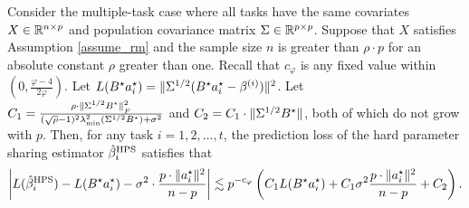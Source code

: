 \begin{theorem}\label{thm_many_tasks}
	Consider the multiple-task case where all tasks have the same covariates $X\in\mathbb{R}^{n\times p}$ and population covariance matrix $\Sigma\in\mathbb{R}^{p\times p}$.
	Suppose that $X$ satisfies Assumption \ref{assume_rm} and the sample size $n$ is greater than $\rho \cdot p$ for an absolute constant $\rho$ greater than one.
	Recall that $c_{\varphi}$ is any fixed value within $(0, \frac{\varphi-4}{2\varphi})$.
	Let $L(B^{\star}a_i^{\star}) = \|\Sigma^{1/2} (B^{\star} a_i^{\star}- \beta^{(i)})\|^2$.
	Let $C_1 = \frac{\rho\cdot \|\Sigma^{1/2} B^{\star}\|_{_{F}}^2}{(\sqrt{\rho} - 1)^2\lambda_{\min}^2(\Sigma^{1/2} B^{\star}) + \sigma^2}$ and $C_2 =  C_1\cdot \|\Sigma^{1/2} B^{\star}\|$, both of which do not grow with $p$.
	Then, for any task $i = 1, 2, \dots, t$, the prediction loss of the hard parameter sharing estimator $\hat{\beta}_i^{\textup{HPS}}$ satisfies that
	\begin{align}
		{\left| {L(\hat{\beta}_i^{\textup{HPS}}) - L(B^{\star}a_i^{\star}) - \sigma^2  \cdot \frac{p \cdot \|a_i^{\star}\|^2}{n - p}} \right|} \lesssim p^{-c_{\varphi}}\left({C_1 L(B^{\star}a_i^{\star}) + C_1 \sigma^2 \frac{p \cdot{\|a_i^{\star}\|^2}}{n-p} + C_2}\right). \label{eq_thm_many}
	\end{align}
\end{theorem}
